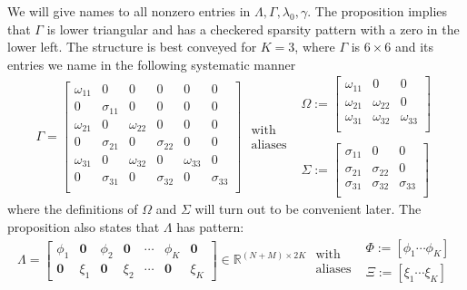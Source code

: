 \documentclass[a4paper,12pt]{article}
\theoremstyle{definition}
\begin{document}
We will give names to all nonzero entries in $\Lambda, \Gamma, \lambda_0, \gamma$.
The proposition implies that $\Gamma$ is lower triangular and has a checkered sparsity pattern with a zero in the lower left. The structure is best conveyed for $K = 3$, where $\Gamma$ is $6 \times 6$ and its entries we name in the following systematic manner
$$\Gamma = \begin{bmatrix}
    \omega_{11} & 0 & 0 & 0 & 0 & 0 \\
    0 & \sigma_{11} & 0 & 0 & 0 & 0 \\
    \omega_{21} & 0 & \omega_{22} & 0 & 0 & 0 \\
    0 & \sigma_{21} & 0 & \sigma_{22} & 0 & 0 \\
    \omega_{31} & 0 & \omega_{32} & 0 & \omega_{33} & 0 \\
    0 & \sigma_{31} & 0 & \sigma_{32} & 0 & \sigma_{33} \\
\end{bmatrix} \begin{array}{c}\text{ with }\\\text{ aliases }\end{array} \begin{array}{c}\Omega := \begin{bmatrix}
    \omega_{11} & 0 & 0\\
    \omega_{21} & \omega_{22} & 0\\
    \omega_{31} & \omega_{32} & \omega_{33}\\
\end{bmatrix} \\ \\ \Sigma := \begin{bmatrix}
    \sigma_{11} & 0 & 0 \\
    \sigma_{21} & \sigma_{22} & 0 \\
    \sigma_{31} & \sigma_{32} & \sigma_{33} \\
\end{bmatrix}\end{array}$$
where the definitions of $\Omega$ and $\Sigma$ will turn out to be convenient later. The proposition also states that $\Lambda$ has pattern:
$$\Lambda = \begin{bmatrix}
    \phi_1 & \mathbf{0} & \phi_2 & \mathbf{0} & \cdots & \phi_K &  \mathbf{0}\\ 
    \mathbf{0} & \xi_1 & \mathbf{0} & \xi_2 &  \cdots & \mathbf{0} & \xi_K
\end{bmatrix} \in \mathbb{R}^{(N+M) \times 2K} \begin{array}{c}\text{ with }\\\text{ aliases }\end{array}  \begin{array}{c} \Phi := [\phi_1 \cdots \phi_K] \\ \Xi := [\xi_1 \cdots \xi_K] \end{array}
$$
\end{document}

